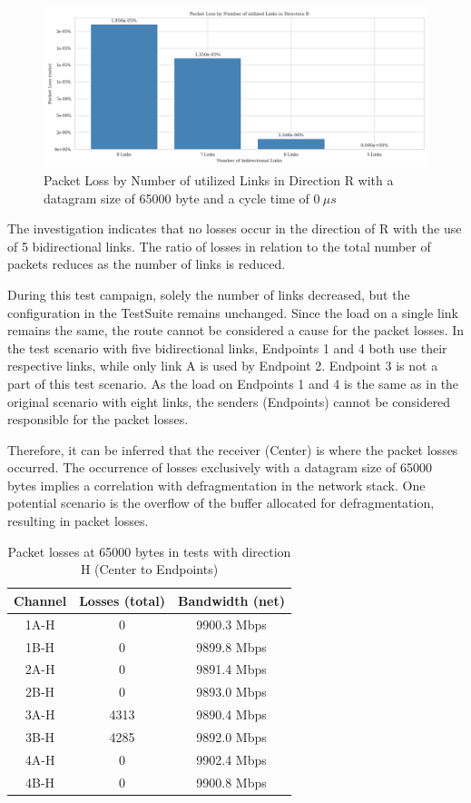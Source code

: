 \documentclass[11pt]{article}
\begin{document}
\begin{figure}[h]
	\includegraphics[width=\textwidth]{fig4.png}
	\centering
	\caption{Packet Loss by Number of utilized Links in Direction R with a datagram size of 65000 byte and a cycle time of \( 0\ \mu s \)   }
    \label{fig:fig4}
\end{figure}

The investigation indicates that no losses occur in the direction of R with the use of 5 bidirectional links. The ratio of losses in relation to the total number of packets reduces as the number of links is reduced.

During this test campaign, solely the number of links decreased, but the configuration in the TestSuite remains unchanged. Since the load on a single link remains the same, the route cannot be considered a cause for the packet losses. In the test scenario with five bidirectional links, Endpoints 1 and 4 both use their respective links, while only link A is used by Endpoint 2. Endpoint 3 is not a part of this test scenario. As the load on Endpoints 1 and 4 is the same as in the original scenario with eight links, the senders (Endpoints) cannot be considered responsible for the packet losses.

Therefore, it can be inferred that the receiver (Center) is where the packet losses occurred. The occurrence of losses exclusively with a datagram size of 65000 bytes implies a correlation with defragmentation in the network stack. One potential scenario is the overflow of the buffer allocated for defragmentation, resulting in packet losses.


\begin{table}[h]
\centering
\begin{tabular}{||c c c||} 
 \hline
 Channel & Losses (total) & Bandwidth (net) \\ [0.5ex] 
 \hline\hline
 1A-H & 0    & 9900.3 Mbps \\ 
 1B-H & 0    & 9899.8 Mbps \\
 2A-H & 0    & 9891.4 Mbps \\
 2B-H & 0    & 9893.0 Mbps \\
 3A-H & 4313 & 9890.4 Mbps \\
 3B-H & 4285 & 9892.0 Mbps \\
 4A-H & 0    & 9902.4 Mbps \\
 4B-H & 0    & 9900.8 Mbps \\ [1ex] 
 \hline
\end{tabular}
\caption{ Packet losses at 65000 bytes in tests with direction H (Center to Endpoints)}
\label{table:2}
\end{table}
\end{document}
